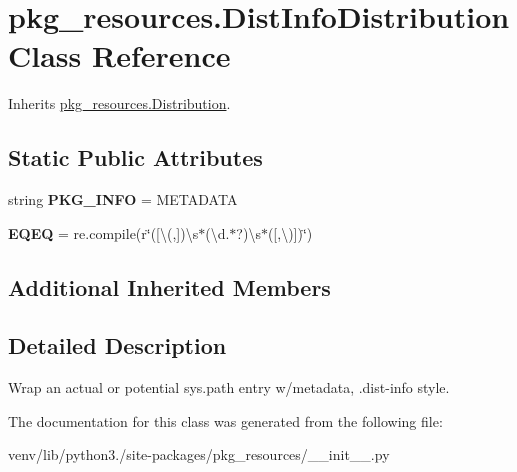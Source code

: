 \hypertarget{classpkg__resources_1_1_dist_info_distribution}{}\section{pkg\+\_\+resources.\+Dist\+Info\+Distribution Class Reference}
\label{classpkg__resources_1_1_dist_info_distribution}


Inherits \hyperlink{classpkg__resources_1_1_distribution}{pkg\+\_\+resources.\+Distribution}.

\subsection*{Static Public Attributes}
\begin{DoxyCompactItemize}
\item 
\mbox{\label{classpkg__resources_1_1_dist_info_distribution_ab6da982f7c44c3f4e90ea400128f653d}} 
string {\bfseries P\+K\+G\+\_\+\+I\+N\+FO} = \textquotesingle{}M\+E\+T\+A\+D\+A\+TA\textquotesingle{}
\item 
\mbox{\label{classpkg__resources_1_1_dist_info_distribution_a46319d8886527d84f930481eb4d2d3c2}} 
{\bfseries E\+Q\+EQ} = re.\+compile(r\char`\"{}(\mbox{[}\textbackslash{}(,\mbox{]})\textbackslash{}s$\ast$(\textbackslash{}d.$\ast$?)\textbackslash{}s$\ast$(\mbox{[},\textbackslash{})\mbox{]})\char`\"{})
\end{DoxyCompactItemize}
\subsection*{Additional Inherited Members}


\subsection{Detailed Description}
\begin{DoxyVerb}Wrap an actual or potential sys.path entry
w/metadata, .dist-info style.
\end{DoxyVerb}
 

The documentation for this class was generated from the following file\+:\begin{DoxyCompactItemize}
\item 
venv/lib/python3./site-\/packages/pkg\+\_\+resources/\+\_\+\+\_\+init\+\_\+\+\_\+.\+py\end{DoxyCompactItemize}
